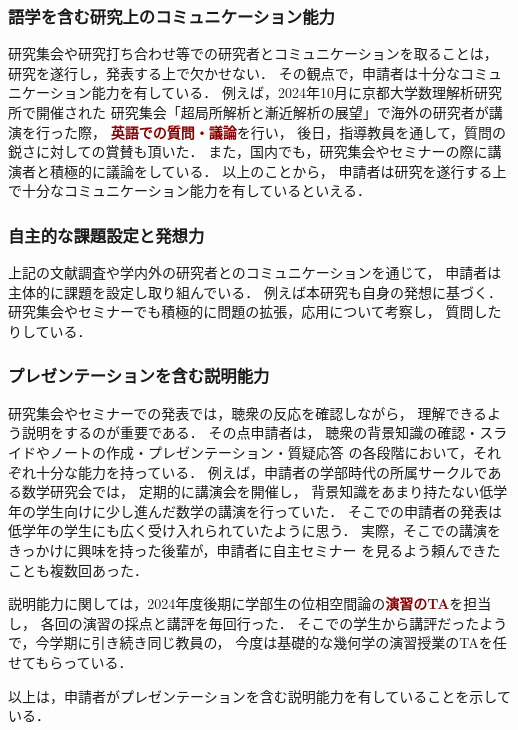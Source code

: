 \documentclass[11pt,a4paper,uplatex,dvipdfmx]{ujarticle} 		%
\newcommand{\研究課題名}{打切り超局所台の関手的性質の研究とMorse理論への応用}
\newcommand{\研究機関名}{北海道大学}
\newcommand{\研究代表者氏名}{大柴寿浩}
\begin{document}
\subsubsection*{語学を含む研究上のコミュニケーション能力}
研究集会や研究打ち合わせ等での研究者とコミュニケーションを取ることは，
研究を遂行し，発表する上で欠かせない．
その観点で，申請者は十分なコミュニケーション能力を有している．
例えば，2024年10月に京都大学数理解析研究所で開催された
研究集会「超局所解析と漸近解析の展望」で海外の研究者が講演を行った際，
\textcolor{darkred}{\textbf{英語での質問・議論}}を行い，
後日，指導教員を通して，質問の鋭さに対しての賞賛も頂いた．
また，国内でも，研究集会やセミナーの際に講演者と積極的に議論をしている．
以上のことから，
申請者は研究を遂行する上で十分なコミュニケーション能力を有しているといえる．

\subsubsection*{自主的な課題設定と発想力}
上記の文献調査や学内外の研究者とのコミュニケーションを通じて，
申請者は主体的に課題を設定し取り組んでいる．
例えば本研究も自身の発想に基づく．
研究集会やセミナーでも積極的に問題の拡張，応用について考察し，
質問したりしている．

\subsubsection*{プレゼンテーションを含む説明能力}
研究集会やセミナーでの発表では，聴衆の反応を確認しながら，
理解できるよう説明をするのが重要である．
その点申請者は，
聴衆の背景知識の確認・スライドやノートの作成・プレゼンテーション・質疑応答
の各段階において，それぞれ十分な能力を持っている．
例えば，申請者の学部時代の所属サークルである数学研究会では，
定期的に講演会を開催し，
背景知識をあまり持たない低学年の学生向けに少し進んだ数学の講演を行っていた．
そこでの申請者の発表は低学年の学生にも広く受け入れられていたように思う．
実際，そこでの講演をきっかけに興味を持った後輩が，申請者に自主セミナー
を見るよう頼んできたことも複数回あった．

説明能力に関しては，2024年度後期に学部生の位相空間論の\textcolor{darkred}{\textbf{演習のTA}}を担当し，
各回の演習の採点と講評を毎回行った．
そこでの学生から講評だったようで，今学期に引き続き同じ教員の，
今度は基礎的な幾何学の演習授業のTAを任せてもらっている．

以上は，申請者がプレゼンテーションを含む説明能力を有していることを示している．
\end{document}
